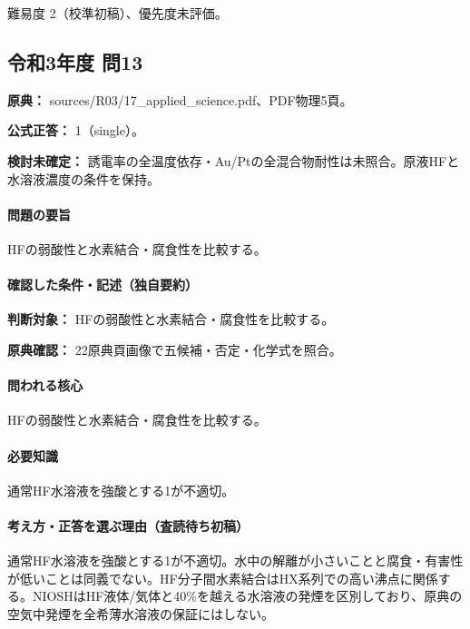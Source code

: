 \par 難易度 2（校準初稿）、優先度未評価。

\subsection{令和3年度 問13}
\label{q:r03-reg-applied-13}

\noindent\textbf{原典：} sources/R03/17\_applied\_science.pdf、PDF物理5頁。

\textbf{公式正答：} 1（single）。

\par\textbf{検討未確定：} 誘電率の全温度依存・Au/Ptの全混合物耐性は未照合。原液HFと水溶液濃度の条件を保持。

\paragraph{問題の要旨} HFの弱酸性と水素結合・腐食性を比較する。

\paragraph{確認した条件・記述（独自要約）}\mbox{}\par

\noindent\textbf{判断対象：} HFの弱酸性と水素結合・腐食性を比較する。\par

\noindent\textbf{原典確認：} 22原典頁画像で五候補・否定・化学式を照合。\par

\paragraph{問われる核心} HFの弱酸性と水素結合・腐食性を比較する。

\paragraph{必要知識} 通常HF水溶液を強酸とする1が不適切。

\paragraph{考え方・正答を選ぶ理由（査読待ち初稿）} 通常HF水溶液を強酸とする1が不適切。水中の解離が小さいことと腐食・有害性が低いことは同義でない。HF分子間水素結合はHX系列での高い沸点に関係する。NIOSHはHF液体/気体と40\%を越える水溶液の発煙を区別しており、原典の空気中発煙を全希薄水溶液の保証にはしない。

